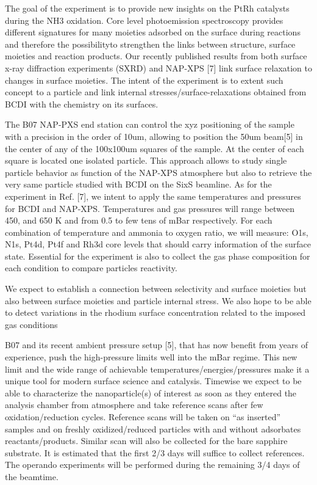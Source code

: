 The goal of the experiment is to provide new insights on the PtRh catalysts during the NH3 oxidation.
Core level photoemission spectroscopy provides different signatures for many moieties adsorbed on the surface during reactions and therefore the possibilityto strengthen the links between structure, surface moieties and reaction products.
Our recently published results from both surface x-ray diffraction experiments (SXRD) and NAP-XPS [7] link surface relaxation to changes in surface moieties.
The intent of the experiment is to extent such concept to a particle and link internal stresses/surface-relaxations obtained from BCDI with the chemistry on its surfaces.

The B07 NAP-PXS end station can control the xyz positioning of the sample with a precision in the order of 10um, allowing to position the 50um beam[5] in the center of
any of the 100x100um squares of the sample.
At the center of each square is located one isolated particle.
This approach allows to study single particle behavior as function of the NAP-XPS atmosphere but also to retrieve the very same particle studied with BCDI on the SixS beamline.
As for the experiment in Ref. [7], we intent to apply the same temperatures and pressures for BCDI and NAP-XPS.
Temperatures and gas pressures will range between 450, and 650 K and from 0.5 to few tens of mBar respectively.
For each combination of temperature and ammonia to oxygen ratio, we will measure: O1s, N1s, Pt4d, Pt4f and Rh3d core levels that should carry information of the surface state.
Essential for the experiment is also to collect the gas phase composition for each condition to compare particles reactivity.

We expect to establish a connection between selectivity and surface moieties but also between surface moieties and particle internal stress. We also hope to be able to detect variations in the rhodium surface concentration related to the imposed gas conditions

B07 and its recent ambient pressure setup [5], that has now benefit from years of experience, push the high-pressure limits well into the mBar regime.
This new limit and the wide range of achievable temperatures/energies/pressures make it a unique tool for modern surface science and catalysis.
Timewise we expect to be able to characterize the nanoparticle(s) of interest as soon as they entered the analysis chamber from atmosphere and take reference scans after few oxidation/reduction cycles.
Reference scans will be taken on “as inserted” samples and on freshly oxidized/reduced particles with and without adsorbates reactants/products.
Similar scan will also be collected for the bare sapphire substrate. It is estimated that the first 2/3 days will suffice to collect references.
The operando experiments will be performed during the remaining 3/4 days of the beamtime.

